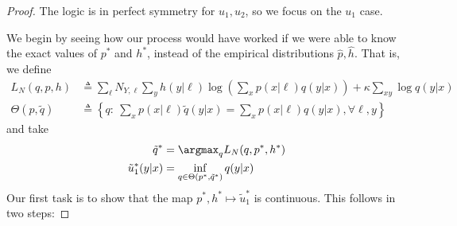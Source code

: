 \begin{proof}

The logic is in perfect symmetry for $u_1,u_2$, so we focus on the $u_1$ case.

We begin by seeing how our process would have worked if we were able to know the exact values of $p^*$ and $h^*$,
instead of the empirical distributions $\hat p,\hat h$.  That is, we define
%
\begin{align*}
L_N(q,p,h) &\triangleq \sum_\ell N_{Y,\ell}\sum_{y}h(y|\ell)\log\left(\sum_{x}p(x|\ell)q(y|x)\right) + \kappa \sum_{xy} \log q(y|x) \\
\Theta(p,\tilde q) &\triangleq\left\{q:\ \sum_x p(x|\ell) \tilde q(y|x) =\sum_x p(x|\ell) q(y|x), \forall \ell,y\right\}
\end{align*}
%
and take
%
\begin{align*}
\tilde q^* &= \argmax_q L_N(q,p^*,h^*)  \\
\tilde u_1^*(y|x) &= \inf_{q\in \Theta(p^*,\tilde q^*)} q(y|x) \\
\end{align*}
%
Our first task is to show that the map $p^*,h^* \mapsto \tilde u_1^*$ is continuous.  This follows in two steps:


\end{proof}

